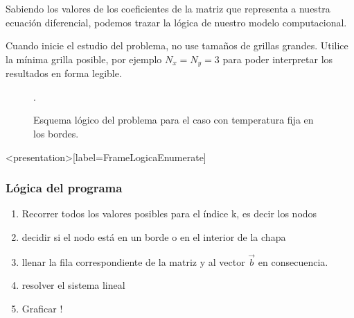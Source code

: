 
Sabiendo los valores de los coeficientes de la matriz que 
representa a nuestra ecuación diferencial, podemos trazar la 
lógica de nuestro modelo computacional.

Cuando inicie el estudio del problema, no use tamaños de grillas 
grandes. Utilice la mínima grilla posible, por ejemplo
$N_x = N_y = 3$ para poder interpretar los resultados 
en forma legible. 

\begin{figure}
  \caption{Esquema lógico del problema para el caso con temperatura fija en los bordes.}
  \label{FiuguraLogica}.
\end{figure}

\mode*

\begin{frame}<presentation>[label=FrameLogicaEnumerate]
  \frametitle{Lógica del programa}
  
\begin{enumerate}
    \item<+-> Recorrer todos los valores posibles para el índice k, es decir los nodos
    \item<+-> decidir si el nodo está en un borde o en el interior de la chapa
    \item<+-> llenar la fila correspondiente de la matriz y al vector $\vec{b}$
      en consecuencia.
    \item<+-> resolver el sistema lineal
    \item<+-> Graficar !
\end{enumerate}

\end{frame}

